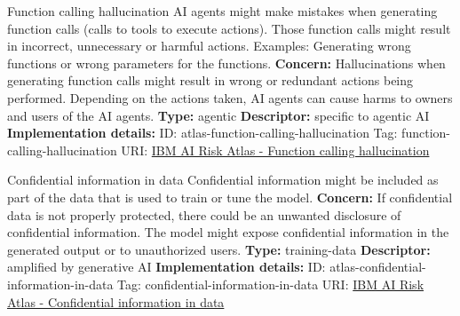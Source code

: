 \documentclass[a4paper,12pt]{article}
\begin{document}
\begin{definitionbox}{Function calling hallucination}
AI agents might make mistakes when generating function calls (calls to tools to execute actions). Those function calls might result in incorrect, unnecessary or harmful actions. Examples: Generating wrong functions or wrong parameters for the functions.\newline\newline
\textbf{Concern: }Hallucinations when generating function calls might result in wrong or redundant actions being performed. Depending on the actions taken, AI agents can cause harms to owners and users of the AI agents.\newline\newline
\textbf{Type: }agentic\newline
\textbf{Descriptor: }specific to agentic AI \newline\newline
\textbf{Implementation details: } \newline
ID: atlas-function-calling-hallucination \newline
Tag: function-calling-hallucination \newline
URI:  \href{https://www.ibm.com/docs/en/watsonx/saas?topic=SSYOK8/wsj/ai-risk-atlas/function-calling-hallucination.html}{IBM AI Risk Atlas - Function calling hallucination}\newline
\end{definitionbox}
\begin{definitionbox}{Confidential information in data}
Confidential information might be included as part of the data that is used to train or tune the model.\newline\newline
\textbf{Concern: }If confidential data is not properly protected, there could be an unwanted disclosure of confidential information. The model might expose confidential information in the generated output or to unauthorized users.\newline\newline
\textbf{Type: }training-data\newline
\textbf{Descriptor: }amplified by generative AI \newline\newline
\textbf{Implementation details: } \newline
ID: atlas-confidential-information-in-data \newline
Tag: confidential-information-in-data \newline
URI:  \href{https://www.ibm.com/docs/en/watsonx/saas?topic=SSYOK8/wsj/ai-risk-atlas/confidential-information-in-data.html}{IBM AI Risk Atlas - Confidential information in data}\newline
\end{definitionbox}
\end{document}
